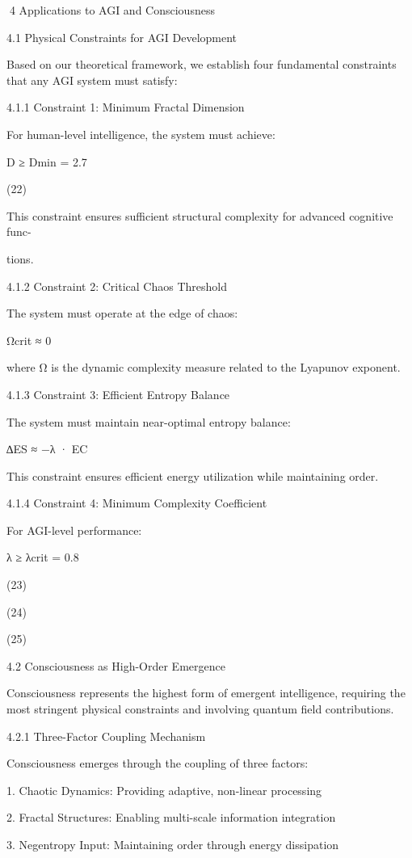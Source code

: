 4 Applications to AGI and Consciousness

4.1 Physical Constraints for AGI Development

Based on our theoretical framework, we establish four fundamental constraints that any
AGI system must satisfy:

4.1.1 Constraint 1: Minimum Fractal Dimension

For human-level intelligence, the system must achieve:

D ≥ Dmin = 2.7

(22)

This constraint ensures sufficient structural complexity for advanced cognitive func-

tions.

4.1.2 Constraint 2: Critical Chaos Threshold

The system must operate at the edge of chaos:

Ωcrit ≈ 0

where Ω is the dynamic complexity measure related to the Lyapunov exponent.

4.1.3 Constraint 3: Efficient Entropy Balance

The system must maintain near-optimal entropy balance:

∆ES ≈ −λ · EC

This constraint ensures efficient energy utilization while maintaining order.

4.1.4 Constraint 4: Minimum Complexity Coefficient

For AGI-level performance:

λ ≥ λcrit = 0.8

(23)

(24)

(25)

4.2 Consciousness as High-Order Emergence

Consciousness represents the highest form of emergent intelligence, requiring the most
stringent physical constraints and involving quantum field contributions.

4.2.1 Three-Factor Coupling Mechanism

Consciousness emerges through the coupling of three factors:

1. Chaotic Dynamics: Providing adaptive, non-linear processing

2. Fractal Structures: Enabling multi-scale information integration

3. Negentropy Input: Maintaining order through energy dissipation

